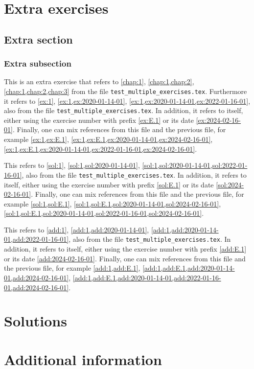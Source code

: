 \documentclass[oneside]{book}
\begin{document}
\chapter{Extra exercises}

\section{Extra section}

\subsection{Extra subsection}

\begin{exercise}[examdate={February 16, 2024}, examproblemnumber={1}, examproblemid={2024-02-16-01}]
This is an extra exercise that refers to \cref{chap:1}, \cref{chap:1,chap:2}, \cref{chap:1,chap:2,chap:3} from the file \texttt{test\_multiple\_exercises.tex}.
Furthermore it refers to \cref{ex:1}, \cref{ex:1,ex:2020-01-14-01}, \cref{ex:1,ex:2020-01-14-01,ex:2022-01-16-01}, also from the file \texttt{test\_multiple\_exercises.tex}.
In addition, it refers to itself, either using the exercise number with prefix \cref{ex:E.1} or its date \cref{ex:2024-02-16-01}.
Finally, one can mix references from this file and the previous file, for example \cref{ex:1,ex:E.1}, \cref{ex:1,ex:E.1,ex:2020-01-14-01,ex:2024-02-16-01}, \cref{ex:1,ex:E.1,ex:2020-01-14-01,ex:2022-01-16-01,ex:2024-02-16-01}.
\end{exercise}

\begin{solution}
This refers to \cref{sol:1}, \cref{sol:1,sol:2020-01-14-01}, \cref{sol:1,sol:2020-01-14-01,sol:2022-01-16-01}, also from the file \texttt{test\_multiple\_exercises.tex}.
In addition, it refers to itself, either using the exercise number with prefix \cref{sol:E.1} or its date \cref{sol:2024-02-16-01}.
Finally, one can mix references from this file and the previous file, for example \cref{sol:1,sol:E.1}, \cref{sol:1,sol:E.1,sol:2020-01-14-01,sol:2024-02-16-01}, \cref{sol:1,sol:E.1,sol:2020-01-14-01,sol:2022-01-16-01,sol:2024-02-16-01}.
\end{solution}

\begin{additionalinformation}
This refers to \cref{add:1}, \cref{add:1,add:2020-01-14-01}, \cref{add:1,add:2020-01-14-01,add:2022-01-16-01}, also from the file \texttt{test\_multiple\_exercises.tex}.
In addition, it refers to itself, either using the exercise number with prefix \cref{add:E.1} or its date \cref{add:2024-02-16-01}.
Finally, one can mix references from this file and the previous file, for example \cref{add:1,add:E.1}, \cref{add:1,add:E.1,add:2020-01-14-01,add:2024-02-16-01}, \cref{add:1,add:E.1,add:2020-01-14-01,add:2022-01-16-01,add:2024-02-16-01}.
\end{additionalinformation}

\chapter{Solutions}

\chapter{Additional information}
\end{document}
